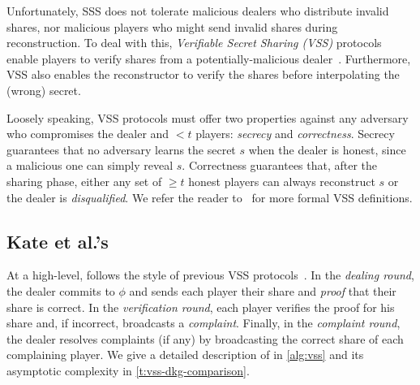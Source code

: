 %
Unfortunately, SSS does not tolerate malicious dealers who distribute invalid shares, nor malicious players who might send invalid shares during reconstruction.
To deal with this, \textit{Verifiable Secret Sharing (VSS)} protocols enable players to verify shares from a potentially-malicious dealer~\cite{CGMA85,Feldman87,Pedersen1991NonInteractive,KZG10a}.
Furthermore, VSS also enables the reconstructor to verify the shares before interpolating the (wrong) secret.

Loosely speaking, VSS protocols must offer two properties against any adversary who compromises the dealer and $<t$ players: \textit{secrecy} and \textit{correctness}.
Secrecy guarantees that no adversary learns the secret $s$ when the dealer is honest, since a malicious one can simply reveal $s$.
Correctness guarantees that, after the sharing phase, either any set of $\ge t$ honest players can always reconstruct $s$ or the dealer is \textit{disqualified}.
We refer the reader to~\cite{KZG10a} for more formal VSS definitions. %

\evssAlgorithm


\subsection{Kate et al.'s \evss}
\label{s:prelim:evss}
At a high-level, \evss follows the style of previous VSS protocols~\cite{Feldman87,Pedersen1991NonInteractive}.
In the \textit{dealing round}, the dealer commits to $\phi$ and sends each player their share and \textit{proof} that their share is correct.
In the \textit{verification round}, each player verifies the proof for his share and, if incorrect, broadcasts a \textit{complaint}.
Finally, in the \textit{complaint round}, the dealer resolves complaints (if any) by broadcasting the correct share of each complaining player.
We give a detailed description of \evss in \cref{alg:vss} and its asymptotic complexity in \cref{t:vss-dkg-comparison}.

